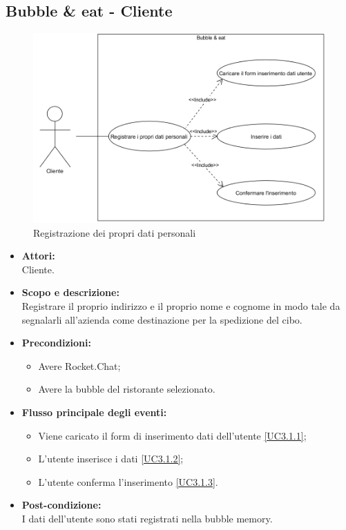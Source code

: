\subsection{Bubble \& eat - Cliente}


\begin{figure}[H]
	\centering
	\includegraphics[width=15cm]{../../documenti/AnalisiDeiRequisiti/Diagrammi_img/uc3_1.png}
	\caption{\UCCaption{} Registrazione dei propri dati personali}
\end{figure}

\begin{itemize}
	\item \textbf{Attori:}
	\\Cliente.
	\item \textbf{Scopo e descrizione:} 
	\\Registrare il proprio indirizzo e il proprio nome e cognome in modo tale da segnalarli all'azienda come destinazione per la spedizione del cibo.
	\item \textbf{Precondizioni:}
	\begin{itemize}
		\item Avere Rocket.Chat;
		\item Avere la bubble del ristorante selezionato.
	\end{itemize}
	\item \textbf{Flusso principale degli eventi:}
	\begin{itemize}
		\item Viene caricato il form di inserimento dati dell'utente \ref{UC3.1.1};
		\item L'utente inserisce i dati \ref{UC3.1.2};
		\item L'utente conferma l'inserimento \ref{UC3.1.3}.
	\end{itemize}
	\item \textbf{Post-condizione:}
	\\I dati dell'utente sono stati registrati nella bubble memory.
\end{itemize}

